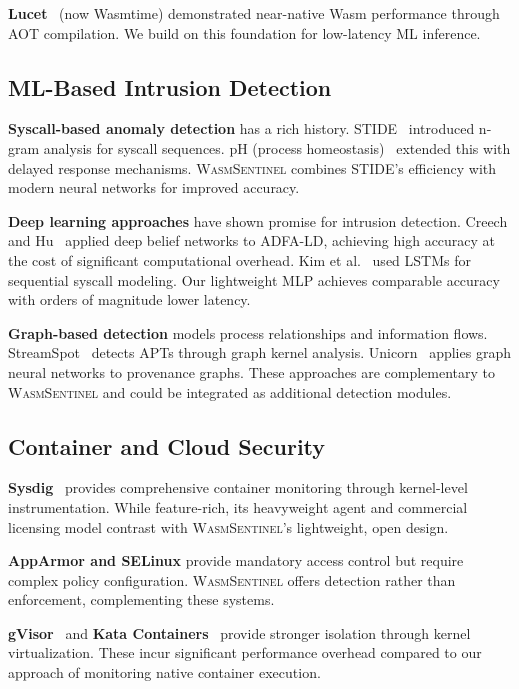 \textbf{Lucet}~\cite{lucet} (now Wasmtime) demonstrated near-native Wasm performance through AOT compilation.
We build on this foundation for low-latency ML inference.

\subsection{ML-Based Intrusion Detection}

\textbf{Syscall-based anomaly detection} has a rich history.
STIDE~\cite{stide} introduced n-gram analysis for syscall sequences.
pH (process homeostasis)~\cite{ph} extended this with delayed response mechanisms.
\textsc{WasmSentinel} combines STIDE's efficiency with modern neural networks for improved accuracy.

\textbf{Deep learning approaches} have shown promise for intrusion detection.
Creech and Hu~\cite{creech} applied deep belief networks to ADFA-LD, achieving high accuracy at the cost of significant computational overhead.
Kim et al.~\cite{kim-lstm} used LSTMs for sequential syscall modeling.
Our lightweight MLP achieves comparable accuracy with orders of magnitude lower latency.

\textbf{Graph-based detection} models process relationships and information flows.
StreamSpot~\cite{streamspot} detects APTs through graph kernel analysis.
Unicorn~\cite{unicorn} applies graph neural networks to provenance graphs.
These approaches are complementary to \textsc{WasmSentinel} and could be integrated as additional detection modules.

\subsection{Container and Cloud Security}

\textbf{Sysdig}~\cite{sysdig} provides comprehensive container monitoring through kernel-level instrumentation.
While feature-rich, its heavyweight agent and commercial licensing model contrast with \textsc{WasmSentinel}'s lightweight, open design.

\textbf{AppArmor and SELinux} provide mandatory access control but require complex policy configuration.
\textsc{WasmSentinel} offers detection rather than enforcement, complementing these systems.

\textbf{gVisor}~\cite{gvisor} and \textbf{Kata Containers}~\cite{kata} provide stronger isolation through kernel virtualization.
These incur significant performance overhead compared to our approach of monitoring native container execution.

